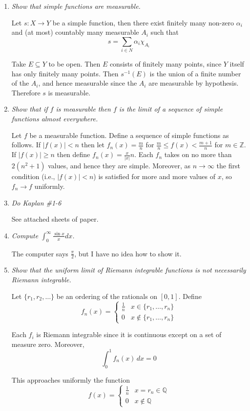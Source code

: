 \documentclass[11pt]{article}
\newcommand{\Q}{\mathbb{Q}}
\newcommand{\Z}{\mathbb{Z}}
\begin{document}
\begin{enumerate}
\item \emph{Show that simple functions are measurable.}

Let $s: X \rightarrow Y$ be a simple function, then there exist finitely many non-zero $\alpha_i$ and (at most) countably many measurable $A_i$ such that
\[
s = \sum_{i \in N} \alpha_i \chi_{A_i}
\]

Take $E \subseteq Y$ to be open.  Then $E$ consists of finitely many points, since $Y$ itself has only finitely many points.  Then $s^{-1}(E)$ is the union of a finite number of the $A_i$, and hence measurable since the $A_i$ are measurable by hypothesis.  Therefore $s$ is measurable.

\item \emph{Show that if $f$ is measurable then $f$ is the limit of a sequence of simple functions almost everywhere.}

Let $f$ be a measurable function.  Define a sequence of simple functions as follows.  If $|f(x)| < n$ then let $f_n(x) = \frac{m}{n}$ for $\frac{m}{n} \leq f(x) < \frac{m+1}{n}$ for $m \in \Z$.  If $|f(x)| \geq n$ then define $f_n(x) = \frac{x}{|x|} n$.  Each $f_n$ takes on no more than $2(n^2+1)$ values, and hence they are simple.  Moreover, as $n \rightarrow \infty$ the first condition (i.e., $|f(x)|<n$) is satisfied for more and more values of $x$, so $f_n \rightarrow f$ uniformly.

\item \emph{Do Kaplan \#1-6}

See attached sheets of paper.

\item \emph{Compute $\int_0^\infty \frac{\sin x}{x} dx$.}

The computer says $\frac{\pi}{2}$, but I have no idea how to show it.

\item \emph{Show that the uniform limit of Riemann integrable functions is not necessarily Riemann integrable.}

Let $\{r_1, r_2, \ldots\}$ be an ordering of the rationals on $[0,1]$.  Define
\[
f_n(x) = \begin{cases}\frac{1}{n} & x \in \{r_1,\ldots,r_n\} \\ 0 & x \notin \{r_1,\ldots,r_n\}\end{cases}
\]

Each $f_i$ is Riemann integrable since it is continuous except on a set of measure zero.  Moreover,
\[
\int_0^1 f_n(x)\,dx = 0
\]

This approaches uniformly the function
\[
f(x) = \begin{cases}\frac{1}{n} & x = r_n \in \Q \\ 0 & x \notin \Q\end{cases}
\]


\end{enumerate}
\end{document}

